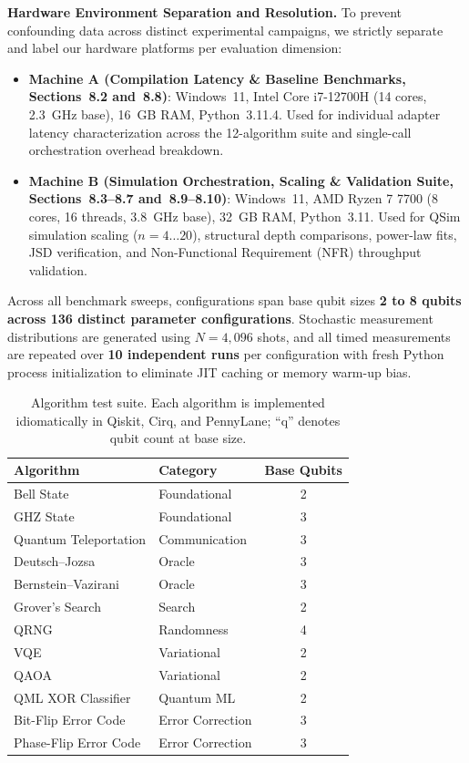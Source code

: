 \documentclass[runningheads]{llncs}
\begin{document}
\textbf{Hardware Environment Separation and Resolution.} To prevent confounding data across distinct experimental campaigns, we strictly separate and label our hardware platforms per evaluation dimension:
\begin{itemize}
    \item \textbf{Machine A (Compilation Latency \& Baseline Benchmarks, Sections~8.2 and~8.8)}: Windows~11, Intel Core i7-12700H (14 cores, 2.3~GHz base), 16~GB RAM, Python~3.11.4. Used for individual adapter latency characterization across the 12-algorithm suite and single-call orchestration overhead breakdown.
    \item \textbf{Machine B (Simulation Orchestration, Scaling \& Validation Suite, Sections~8.3--8.7 and~8.9--8.10)}: Windows~11, AMD Ryzen 7 7700 (8 cores, 16 threads, 3.8~GHz base), 32~GB RAM, Python~3.11. Used for QSim simulation scaling ($n=4\dots20$), structural depth comparisons, power-law fits, JSD verification, and Non-Functional Requirement (NFR) throughput validation.
\end{itemize}

Across all benchmark sweeps, configurations span base qubit sizes \textbf{2 to 8 qubits across 136 distinct parameter configurations}. Stochastic measurement distributions are generated using $N=4,096$ shots, and all timed measurements are repeated over \textbf{10 independent runs} per configuration with fresh Python process initialization to eliminate JIT caching or memory warm-up bias.

\begin{table}[htbp]
\centering
\caption{Algorithm test suite. Each algorithm is implemented idiomatically in Qiskit, Cirq, and PennyLane; ``q'' denotes qubit count at base size.}
\label{tab:algorithms}
\renewcommand{\arraystretch}{1.15}
\setlength{\tabcolsep}{12pt}
\begin{tabular}{@{}llc@{}}
\toprule
\textbf{Algorithm} & \textbf{Category} & \textbf{Base Qubits} \\
\midrule
Bell State & Foundational & 2 \\
GHZ State & Foundational & 3 \\
Quantum Teleportation & Communication & 3 \\
Deutsch--Jozsa & Oracle & 3 \\
Bernstein--Vazirani & Oracle & 3 \\
Grover's Search & Search & 2 \\
QRNG & Randomness & 4 \\
VQE & Variational & 2 \\
QAOA & Variational & 2 \\
QML XOR Classifier & Quantum ML & 2 \\
Bit-Flip Error Code & Error Correction & 3 \\
Phase-Flip Error Code & Error Correction & 3 \\
\bottomrule
\end{tabular}
\end{table}
\end{document}
